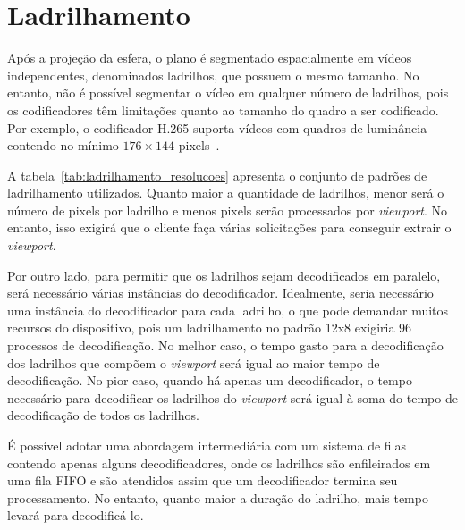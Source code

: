 \section{Ladrilhamento}

Após a projeção da esfera, o plano é segmentado espacialmente em vídeos independentes, denominados ladrilhos, que possuem o mesmo tamanho. No entanto, não é possível segmentar o vídeo em qualquer número de ladrilhos, pois os codificadores têm limitações quanto ao tamanho do quadro a ser codificado. Por exemplo, o codificador H.265 suporta vídeos com quadros de luminância contendo no mínimo $176\times144$ pixels~\cite{Sullivan2012a}.

A tabela~\ref{tab:ladrilhamento_resolucoes} apresenta o conjunto de padrões de ladrilhamento utilizados. Quanto maior a quantidade de ladrilhos, menor será o número de pixels por ladrilho e menos pixels serão processados por \textit{viewport}. No entanto, isso exigirá que o cliente faça várias solicitações para conseguir extrair o \textit{viewport}.

Por outro lado, para permitir que os ladrilhos sejam decodificados em paralelo, será necessário várias instâncias do decodificador. Idealmente, seria necessário uma instância do decodificador para cada ladrilho, o que pode demandar muitos recursos do dispositivo, pois um ladrilhamento no padrão 12x8 exigiria 96 processos de decodificação. No melhor caso, o tempo gasto para a decodificação dos ladrilhos que compõem o \textit{viewport} será igual ao maior tempo de decodificação. No pior caso, quando há apenas um decodificador, o tempo necessário para decodificar os ladrilhos do \textit{viewport} será igual à soma do tempo de decodificação de todos os ladrilhos.

É possível adotar uma abordagem intermediária com um sistema de filas contendo apenas alguns decodificadores, onde os ladrilhos são enfileirados em uma fila FIFO e são atendidos assim que um decodificador termina seu processamento. No entanto, quanto maior a duração do ladrilho, mais tempo levará para decodificá-lo.

